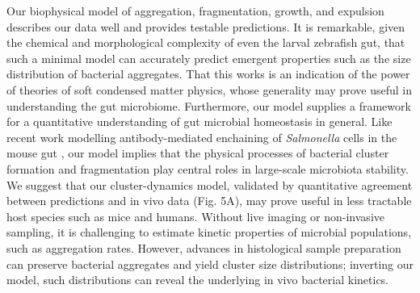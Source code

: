 Our biophysical model of aggregation, fragmentation, growth, and expulsion describes our data well and provides testable predictions. It is remarkable, given the chemical and morphological complexity of even the larval zebrafish gut, that such a minimal model can accurately predict emergent properties such as the size distribution of bacterial aggregates. That this works is an indication of the power of theories of soft condensed matter physics, whose generality may prove useful in understanding the gut microbiome. Furthermore, our model supplies a framework for a quantitative understanding of gut microbial homeostasis in general. Like recent work modelling antibody-mediated enchaining of \textit{Salmonella} cells in the mouse gut \cite{bansept2019enchained}, our model implies that the physical processes of bacterial cluster formation and fragmentation play central roles in large-scale microbiota stability. We suggest that our cluster-dynamics model, validated by quantitative agreement between  predictions and in vivo data (Fig. 5A), may prove useful in less tractable host species such as mice and humans. Without live imaging or non-invasive sampling, it is challenging to estimate kinetic properties of microbial populations, such as aggregation rates. However, advances in histological sample preparation \cite{tropini_gut_2017} can preserve bacterial aggregates and yield cluster size distributions; inverting our model, such distributions can reveal the underlying in vivo bacterial kinetics.

